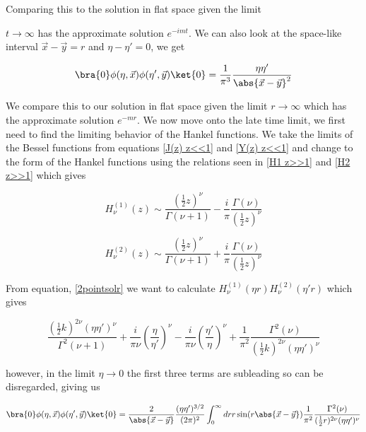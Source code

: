 \documentclass[a4paper,11pt]{article}
\numberwithin{equation}{section}
\numberwithin{figure}{section}
\begin{document}
\begin{large}
Comparing this to the solution in flat space given the limit 

$t\rightarrow\infty$ has the approximate solution $e^{-imt}$. We can also look at the space-like interval $\Vec{x}-\Vec{y}=r$ and $\eta-\eta'=0$, we get 


\begin{equation}
\label{2point eta>>1 eta-eta'=0}    
    \bra{0} \phi(\eta,\Vec{x})\phi(\eta',\Vec{y})\ket{0}=\frac{1}{\pi^3} \frac{\eta\eta'}{\abs{\Vec{x}-\Vec{y}}^2}
\end{equation}

We compare this to our solution in flat space given the limit $r\rightarrow\infty$ which has the approximate solution $e^{-mr}$.
\newline
We now move onto the late time limit, we first need to find the limiting behavior of the Hankel functions. We take the limits of the Bessel functions from equations \eqref{J(z) z<<1} and \eqref{Y(z) z<<1} and change to the form of the Hankel functions using the relations seen in \eqref{H1 z>>1} and \eqref{H2 z>>1} which gives

\begin{equation}
\label{H1 z<<1}    
    H^{(1)}_\nu(z)\sim \frac{(\frac{1}{2}z)^\nu}{\Gamma(\nu+1)}-\frac{i}{\pi}\frac{\Gamma(\nu)}{(\frac{1}{2}z)^\nu}
\end{equation}

\begin{equation}
\label{H2 z<<1}    
    H^{(2)}_\nu(z)\sim \frac{(\frac{1}{2}z)^\nu}{\Gamma(\nu+1)}+\frac{i}{\pi}\frac{\Gamma(\nu)}{(\frac{1}{2}z)^\nu}
\end{equation}

From equation, \eqref{2pointsolr} we want to calculate $H^{(1)}_\nu(\eta r)H^{(2)}_\nu(\eta'r)$ which gives 

\begin{equation}
\label{H1H2}    
    \frac{(\frac{1}{2}k)^{2\nu}(\eta\eta')^\nu}{\Gamma^2(\nu+1)}+\frac{i}{\pi\nu}(\frac{\eta}{\eta'})^\nu-\frac{i}{\pi\nu}(\frac{\eta'}{\eta})^\nu+\frac{1}{\pi^2}\frac{\Gamma^2(\nu)}{(\frac{1}{2}k)^{2\nu}(\eta\eta')^\nu}
\end{equation}

however, in the limit $\eta\rightarrow0$ the first three terms are subleading so can be disregarded, giving us

\begin{equation}
\label{2pointsolr eta<<1}    
    \bra{0} \phi(\eta,\Vec{x})\phi(\eta',\Vec{y})\ket{0}=\frac{2}{\abs{\Vec{x}-\Vec{y}}}\frac{(\eta\eta')^{3/2}}{(2\pi)^2}\int^\infty_0 dr r \sin(r \abs{\Vec{x}-\Vec{y}}) \frac{1}{\pi^2}\frac{\Gamma^2(\nu)}{(\frac{1}{2}r)^{2\nu}(\eta\eta')^\nu}
\end{equation}


\end{large}
\end{document}
